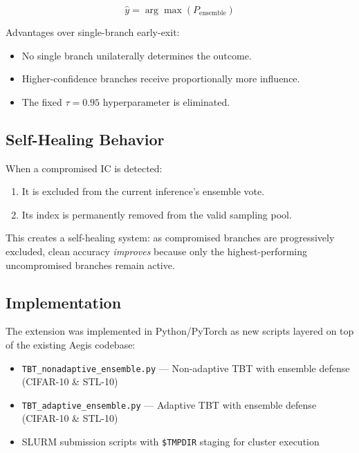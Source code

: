 \documentclass[12pt,a4paper]{article}
\newcommand{\tbt}{\textsc{TBT}}
\newcommand{\ic}{\textsc{IC}}
\begin{document}
\begin{equation}
    \hat{y} = \arg\max\left(P_{\text{ensemble}}\right)
    \label{eq:prediction}
\end{equation}

Advantages over single-branch early-exit:
\begin{itemize}
    \item No single branch unilaterally determines the outcome.
    \item Higher-confidence branches receive proportionally more influence.
    \item The fixed $\tau = 0.95$ hyperparameter is eliminated.
\end{itemize}

\subsection{Self-Healing Behavior}

When a compromised \ic{} is detected:
\begin{enumerate}
    \item It is excluded from the current inference's ensemble vote.
    \item Its index is permanently removed from the valid sampling pool.
\end{enumerate}
This creates a self-healing system: as compromised branches are progressively excluded, clean accuracy \emph{improves} because only the highest-performing uncompromised branches remain active.

\subsection{Implementation}

The extension was implemented in Python/PyTorch as new scripts layered on top of the existing Aegis codebase:
\begin{itemize}
    \item \texttt{TBT\_nonadaptive\_ensemble.py} --- Non-adaptive \tbt{} with ensemble defense (CIFAR-10 \& STL-10)
    \item \texttt{TBT\_adaptive\_ensemble.py} --- Adaptive \tbt{} with ensemble defense (CIFAR-10 \& STL-10)
    \item SLURM submission scripts with \texttt{\$TMPDIR} staging for cluster execution
\end{itemize}
\end{document}
